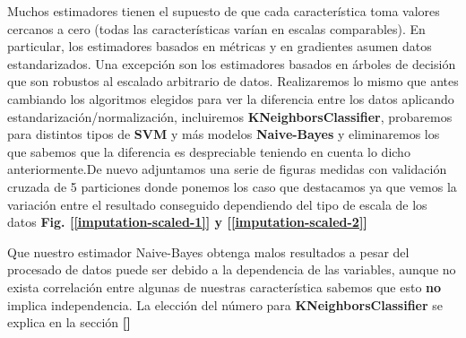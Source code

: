 \documentclass[12pt,twoside]{report}
\begin{document}
Muchos estimadores tienen el supuesto de que cada característica toma valores cercanos a cero (todas las características varían en escalas comparables). En particular, los estimadores basados en métricas y en gradientes asumen datos estandarizados. Una excepción son los estimadores basados en árboles de decisión que son robustos al escalado arbitrario de datos. Realizaremos lo mismo que antes cambiando los algoritmos elegidos para ver la diferencia entre los datos aplicando estandarización/normalización, incluiremos \textbf{KNeighborsClassifier}, probaremos para distintos tipos de \textbf{SVM} y más modelos \textbf{Naive-Bayes} y eliminaremos los que sabemos que la diferencia es despreciable teniendo en cuenta lo dicho anteriormente.De nuevo adjuntamos una serie de figuras medidas con validación cruzada de 5 particiones donde ponemos los caso que destacamos ya que vemos la variación entre el resultado conseguido dependiendo del tipo de escala de los datos \textbf{Fig. [\ref{imputation-scaled-1}] y [\ref{imputation-scaled-2}]}


Que nuestro estimador Naive-Bayes obtenga malos resultados a pesar del procesado de datos puede ser debido a la dependencia de las variables, aunque no exista correlación entre algunas de nuestras característica sabemos que esto \textbf{no} implica independencia. La elección del número para \textbf{KNeighborsClassifier} se explica en la sección \textbf{[]}
\end{document}
